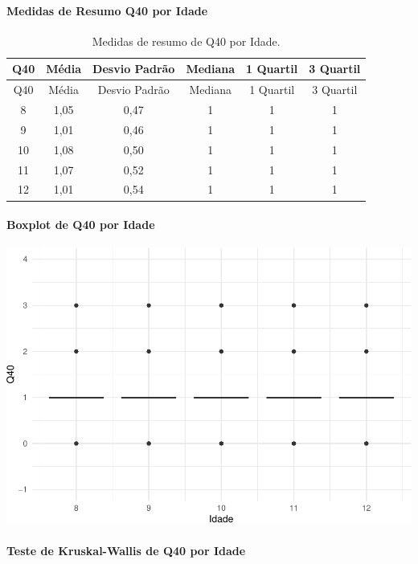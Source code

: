 \documentclass[]{article}
\let\oldparagraph\paragraph
\renewcommand{\paragraph}[1]{\oldparagraph{#1}\mbox{}}
\begin{document}
\cleardoublepage

\hypertarget{medidas-de-resumo-q40-por-idade}{%
\paragraph{Medidas de Resumo Q40 por Idade}\label{medidas-de-resumo-q40-por-idade}}

\begin{longtable}[]{@{}cccccc@{}}
\caption{\label{tab:unnamed-chunk-1571}Medidas de resumo de Q40 por Idade.}\tabularnewline
\toprule
Q40 & Média & Desvio Padrão & Mediana & 1 Quartil & 3 Quartil\tabularnewline
\midrule
\endfirsthead
\toprule
Q40 & Média & Desvio Padrão & Mediana & 1 Quartil & 3 Quartil\tabularnewline
\midrule
\endhead
8 & 1,05 & 0,47 & 1 & 1 & 1\tabularnewline
9 & 1,01 & 0,46 & 1 & 1 & 1\tabularnewline
10 & 1,08 & 0,50 & 1 & 1 & 1\tabularnewline
11 & 1,07 & 0,52 & 1 & 1 & 1\tabularnewline
12 & 1,01 & 0,54 & 1 & 1 & 1\tabularnewline
\bottomrule
\end{longtable}

\hypertarget{boxplot-de-q40-por-idade}{%
\paragraph{Boxplot de Q40 por Idade}\label{boxplot-de-q40-por-idade}}

\begin{center}\includegraphics[width=0.75\linewidth]{relatorio_covid19_files/figure-latex/unnamed-chunk-1572-1} \end{center}

\hypertarget{teste-de-kruskal-wallis-de-q40-por-idade}{%
\paragraph{Teste de Kruskal-Wallis de Q40 por Idade}\label{teste-de-kruskal-wallis-de-q40-por-idade}}
\end{document}
